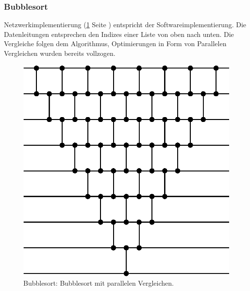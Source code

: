 \documentclass[11pt]{article}
\begin{document}
\subsubsection{Bubblesort}
\FloatBarrier
Netzwerkimplementierung (\ref{fig:bubblesort} Seite \pageref{fig:bubblesort}) entspricht der Softwareimplementierung. Die Datenleitungen entsprechen den Indizes einer Liste von oben nach unten. Die Vergleiche folgen dem Algorithmus, Optimierungen in Form von Parallelen Vergleichen wurden bereits vollzogen.
\begin{figure}
\begin{center}
\includegraphics[scale=0.8]{bubblesort.eps}
\end{center}
\caption{Bubblesort: Bubblesort mit parallelen Vergleichen.}
\label{fig:bubblesort}
\end{figure}
\FloatBarrier
\end{document}
